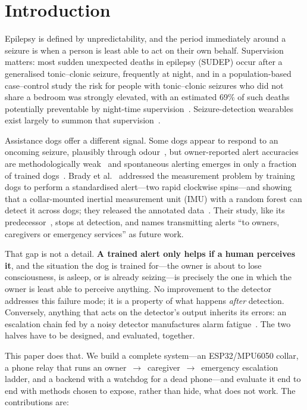 \section{Introduction}
\label{sec:intro}

Epilepsy is defined by unpredictability, and the period immediately around a seizure is when a person is least able to act on their own behalf. Supervision matters: most sudden unexpected deaths in epilepsy (SUDEP) occur after a generalised tonic--clonic seizure, frequently at night, and in a population-based case--control study the risk for people with tonic--clonic seizures who did not share a bedroom was strongly elevated, with an estimated 69\% of such deaths potentially preventable by night-time supervision~\cite{ryvlin2013mortemus,vanderlende2018nocturnal,sveinsson2020sudep}. Seizure-detection wearables exist largely to summon that supervision~\cite{ryvlin2018wearable,beniczky2021ilae}.

Assistance dogs offer a different signal. Some dogs appear to respond to an oncoming seizure, plausibly through odour~\cite{catala2019odour,maa2021voc}, but owner-reported alert accuracies are methodologically weak~\cite{catala2018scoping,brown2011sad} and spontaneous alerting emerges in only a fraction of trained dogs~\cite{kirton2008srd}. Brady et al.~\cite{brady2025collar} addressed the measurement problem by training dogs to perform a standardised alert---two rapid clockwise spins---and showing that a collar-mounted inertial measurement unit (IMU) with a random forest can detect it across dogs; they released the annotated data~\cite{song2025figshare}. Their study, like its predecessor~\cite{raju2023signalling}, stops at detection, and names transmitting alerts ``to owners, caregivers or emergency services'' as future work.

That gap is not a detail. \textbf{A trained alert only helps if a human perceives it}, and the situation the dog is trained for---the owner is about to lose consciousness, is asleep, or is already seizing---is precisely the one in which the owner is least able to perceive anything. No improvement to the detector addresses this failure mode; it is a property of what happens \emph{after} detection. Conversely, anything that acts on the detector's output inherits its errors: an escalation chain fed by a noisy detector manufactures alarm fatigue~\cite{cvach2012alarm,sendelbach2013alarm}. The two halves have to be designed, and evaluated, together.

This paper does that. We build a complete system---an ESP32/MPU6050 collar, a phone relay that runs an owner~$\rightarrow$~caregiver~$\rightarrow$~emergency escalation ladder, and a backend with a watchdog for a dead phone---and evaluate it end to end with methods chosen to expose, rather than hide, what does not work. The contributions are:

